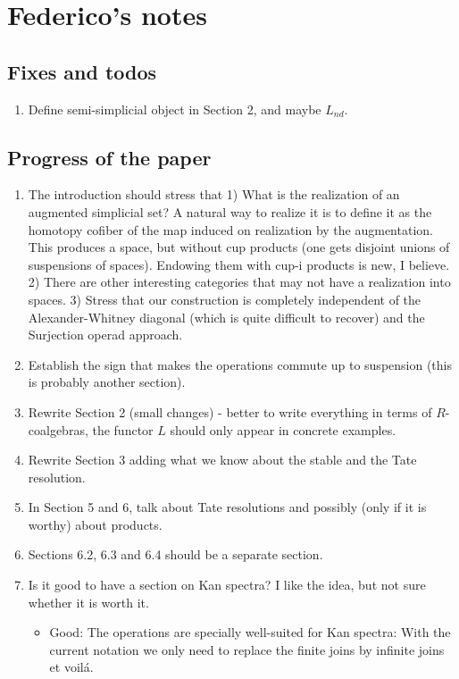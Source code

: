 \documentclass{report}
\begin{document}
	\section*{Federico's notes}
	\subsection*{Fixes and todos}
	\begin{enumerate}
		\item Define semi-simplicial object in Section 2, and maybe $L_{nd}$.
	\end{enumerate}
	\subsection*{Progress of the paper}
	\begin{enumerate}
		\item The introduction should stress that 1) What is the realization of an augmented simplicial set? A natural way to realize it is to define it as the homotopy cofiber of the map induced on realization by the augmentation. This produces a space, but without cup products (one gets disjoint unions of suspensions of spaces). Endowing them with cup-i products is new, I believe. 2) There are other interesting categories that may not have a realization into spaces. 3) Stress that our construction is completely independent of the Alexander-Whitney diagonal (which is quite difficult to recover) and the Surjection operad approach.
		\item Establish the sign that makes the operations commute up to suspension (this is probably another section).
		\item Rewrite Section 2 (small changes) - better to write everything in terms of $R$-coalgebras, the functor $L$ should only appear in concrete examples.
		\item Rewrite Section 3 adding what we know about the stable and the Tate resolution.
		\item In Section 5 and 6, talk about Tate resolutions and possibly (only if it is worthy) about products.
		\item Sections 6.2, 6.3 and 6.4 should be a separate section.
		\item Is it good to have a section on Kan spectra? I like the idea, but not sure whether it is worth it.
		\begin{itemize}
			\item Good: The operations are specially well-suited for Kan spectra: With the current notation we only need to replace the finite joins by infinite joins et voilá.

\end{itemize}
\end{enumerate}
\end{document}
